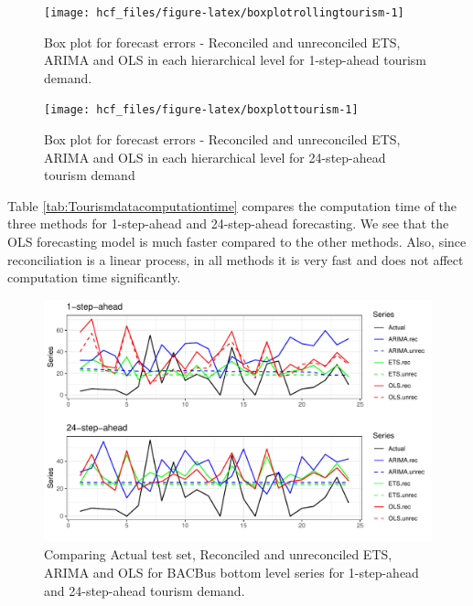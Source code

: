 \documentclass[11pt,a4paper,]{article}
\begin{document}
\begin{figure}

{\centering \texttt{[image: hcf\_files/figure-latex/boxplotrollingtourism-1]} 

}

\caption{Box plot for forecast errors - Reconciled and unreconciled ETS, ARIMA and OLS in each hierarchical level for 1-step-ahead tourism demand.}\label{fig:boxplotrollingtourism}
\end{figure}

\begin{figure}

{\centering \texttt{[image: hcf\_files/figure-latex/boxplottourism-1]} 

}

\caption{Box plot for forecast errors - Reconciled and unreconciled ETS, ARIMA and OLS in each hierarchical level for 24-step-ahead tourism demand}\label{fig:boxplottourism}
\end{figure}

Table \ref{tab:Tourismdatacomputationtime} compares the computation time of the three methods for 1-step-ahead and 24-step-ahead forecasting. We see that the OLS forecasting model is much faster compared to the other methods. Also, since reconciliation is a linear process, in all methods it is very fast and does not affect computation time significantly.

\begin{figure}

{\centering \includegraphics[width=1\linewidth]{hcf_files/figure-latex/forecstrolling24tourism-1} 

}

\caption{Comparing Actual test set, Reconciled and unreconciled ETS, ARIMA and OLS for BACBus bottom level series for 1-step-ahead and 24-step-ahead tourism demand.}\label{fig:forecstrolling24tourism}
\end{figure}
\end{document}
